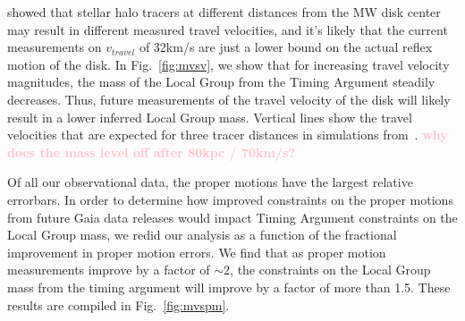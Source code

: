 \documentclass[twocolumn]{aastex631}
\newcommand{\kc}[1]{\textcolor{pink}{\textbf{#1}} }
\begin{document}
\cite{Garavito-Camargo2021b} showed that stellar halo tracers at different distances from the MW disk center may result in different measured travel velocities, and it's likely that the current measurements on $v_{travel}$ of 32km/s are just a lower bound on the actual reflex motion of the disk. In Fig.~\ref{fig:mvsv}, we show that for increasing travel velocity magnitudes, the mass of the Local Group from the Timing Argument steadily decreases. Thus, future measurements of the travel velocity of the disk will likely result in a lower inferred Local Group mass. Vertical lines show the travel velocities that are expected for three tracer distances in simulations from~\cite{Garavito-Camargo2021b}. \kc{why does the mass level off after 80kpc / 70km/s? }

Of all our observational data, the proper motions have the largest relative errorbars. In order to determine how improved constraints on the proper motions from future Gaia data releases would impact Timing Argument constraints on the Local Group mass, we redid our analysis as a function of the fractional improvement in proper motion errors.
We find that as proper motion measurements improve by a factor of $\sim2$, the constraints on the Local Group mass from the timing argument will improve by a factor of more than 1.5. These results are compiled in Fig.~\ref{fig:mvspm}.
\end{document}
